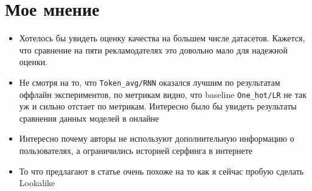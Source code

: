 \section{Мое мнение}

\begin{itemize}
    \item Хотелось бы увидеть оценку качества на большем числе датасетов. Кажется, что сравнение на пяти рекламодателях это довольно мало для надежной оценки.
    \item Не смотря на то, что \texttt{Token\_avg/RNN} оказался лучшим по результатам оффлайн экспериментов, по метрикам видно, что baseline \texttt{One\_hot/LR} не так уж и сильно отстает по метрикам. Интересно было бы увидеть результаты сравнения данных моделей в онлайне
    \item Интересно почему авторы не используют дополнительную информацию о пользователях, а ограничились историей серфинга в интернете
    \item То что предлагают в статье очень похоже на то как я сейчас пробую сделать Lookalike
\end{itemize}